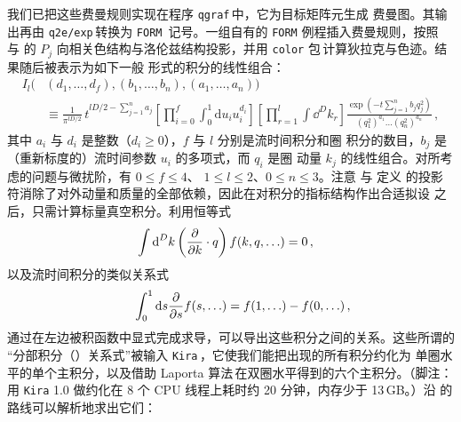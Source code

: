 我们已把这些费曼规则实现在程序
\texttt{qgraf}\,\cite{Nogueira:1991ex,Nogueira:2006pq}中，它为目标矩阵元生成
费曼图。其输出再由
\texttt{q2e/exp}\,\cite{Harlander:1997zb,Seidensticker:1999bb}转换为
\texttt{FORM}\,\cite{Vermaseren:2000nd,Kuipers:2012rf} 记号。一组自有的
\texttt{FORM} 例程插入费曼规则，按照  与  的 $P_j$
向相关色结构与洛伦兹结构投影，并用 \texttt{color}
包\,\cite{vanRitbergen:1998pn}计算狄拉克与色迹。结果随后被表示为如下一般
形式的积分的线性组合：
\begin{equation}
  \begin{split}
    I_l( &(d_1, \dots, d_f ), (b_1, \dots, b_n ), ( a_1, \dots, a_n ))
    \\ &\equiv \frac{1}{\pi^{lD/2}} \, t^{lD/2-\sum_{j=1}^n a_j} \left[\prod_{i=0}^f
     \int_0^1 \mathrm{d}u_i u_i^{d_i} \right]
    \left[\prod_{r=1}^l\int\dd^Dk_r\right]\frac{\exp(-t \sum_{j=1}^n b_j
      q_j^2)}{(q_1^2)^{a_1}\dots (q_n^2)^{a_n}}\,,
    \label{eq:fl}
  \end{split}
\end{equation}
其中 $a_i$ 与 $d_i$ 是整数（$d_i\geq 0$），$f$ 与 $l$ 分别是流时间积分和圈
积分的数目，$b_j$ 是（重新标度的）流时间参数 $u_i$ 的多项式，而 $q_i$ 是圈
动量 $k_j$ 的线性组合。对所考虑的问题与微扰阶，有 $0\leq f\leq 4$、
$1 \leq l\leq 2$、$0 \leq n \leq 3$。注意  与  定义
的投影符消除了对外动量和质量的全部依赖，因此在对积分的指标结构作出合适拟设
之后，只需计算标量真空积分。利用恒等式\,\cite{Chetyrkin:1981qh}
\begin{equation}
  \begin{split}
    &\int\text{d}^D k \left(\frac{\partial }{\partial k}\cdot q\right) f(k,q,\ldots) =
    0\,,
    \label{eq:ibp}
  \end{split}
\end{equation}
以及流时间积分的类似关系式
\begin{equation}
  \begin{split}
    \qquad\int_0^1\text{d} s \frac{\partial }{\partial s} f(s,\ldots) =
    f(1,\ldots)-f(0,\ldots)\,,
    \label{eq:ibpflow}
  \end{split}
\end{equation}
通过在左边被积函数中显式完成求导，可以导出这些积分之间的关系。这些所谓的
``分部积分（）关系式''被输入
\texttt{Kira}\,\cite{Maierhoefer:2017hyi}，它使我们能把出现的所有积分约化为
单圈水平的单个主积分，以及借助 Laporta
算法\,\cite{Laporta:2001dd}在双圈水平得到的六个主积分。（脚注：用
\texttt{Kira} 1.0 做约化在 8 个 CPU 线程上耗时约 20 分钟，内存少于
13\,GB。）沿  的路线可以解析地求出它们：
